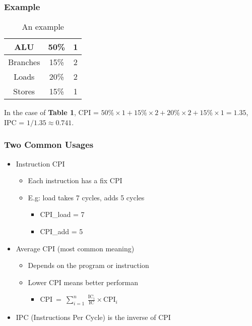 \documentclass[12pt]{article}
\begin{document}
            \subsubsection{Example}
                \begin{table}[]
                    \centering
                    \begin{tabular}{|c|c|c|}
                        \hline
                        ALU      & 50\% & 1 \\ \hline
                        Branches & 15\% & 2 \\ \hline
                        Loads    & 20\% & 2 \\ \hline
                        Stores   & 15\% & 1 \\ \hline
                    \end{tabular}
                    \caption{An example}
                    \label{tab:my_label}
                \end{table}
                In the case of \textbf{Table 1}, CPI = $50\%\times 1+15\%\times 2+20\%\times 2+15\%\times 1 = 1.35$, IPC = $1/1.35\approx 0.741$.
            \subsubsection{Two Common Usages}
                \begin{itemize}
                    \item {Instruction CPI}\\
                         \begin{itemize}
                            \item {Each instruction has a fix CPI}
                            \item {E.g: load takes 7 cycles, adds 5 cycles}
                            \begin{itemize}
                                \item {CPI\_load = 7}
                                \item {CPI\_add = 5}
                            \end{itemize}
                        \end{itemize} 
                    \item {Average CPI (most common meaning)}
                        \begin{itemize}
                            \item {Depends on the program or instruction}\\
                            \item {Lower CPI means better performan}
                                \begin{itemize}
                                    \item CPI$\:=\:\sum _{i=1}^n\:\frac{\text{IC}_i}{\text{IC}}\times   \text{CPI}_i$
                                \end{itemize}
                        \end{itemize}
                    \item {IPC (Instructions Per Cycle) is the inverse of CPI}
                \end{itemize} 
        
        
\end{document}
